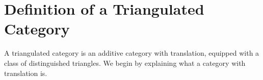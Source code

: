 
\section{Definition of a Triangulated Category}\label{sec:triangular-def}
\hypertarget{o014.aljabr2.chapter4.triangulated-category-definition}{ }

A triangulated category is an additive category with translation, equipped
with a class of distinguished triangles. We begin by explaining what a
category with translation is.

